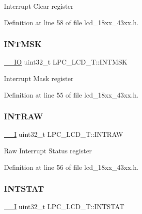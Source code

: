 Interrupt Clear register 

Definition at line 58 of file lcd\+\_\+18xx\+\_\+43xx.\+h.

\mbox{\label{struct_l_p_c___l_c_d___t_a6d3240d9683ac3f5094e224937a841f1}} 
\subsubsection{\texorpdfstring{I\+N\+T\+M\+SK}{INTMSK}}
{\footnotesize\ttfamily \hyperlink{core__sc300_8h_aec43007d9998a0a0e01faede4133d6be}{\+\_\+\+\_\+\+IO} uint32\+\_\+t L\+P\+C\+\_\+\+L\+C\+D\+\_\+\+T\+::\+I\+N\+T\+M\+SK}

Interrupt Mask register 

Definition at line 55 of file lcd\+\_\+18xx\+\_\+43xx.\+h.

\mbox{\label{struct_l_p_c___l_c_d___t_ab94c8521ee68bc8b6748f2ade4632b0c}} 
\subsubsection{\texorpdfstring{I\+N\+T\+R\+AW}{INTRAW}}
{\footnotesize\ttfamily \hyperlink{core__sc300_8h_af63697ed9952cc71e1225efe205f6cd3}{\+\_\+\+\_\+I} uint32\+\_\+t L\+P\+C\+\_\+\+L\+C\+D\+\_\+\+T\+::\+I\+N\+T\+R\+AW}

Raw Interrupt Status register 

Definition at line 56 of file lcd\+\_\+18xx\+\_\+43xx.\+h.

\mbox{\label{struct_l_p_c___l_c_d___t_a8f757ac8345402f52b4c401eadfeb5d9}} 
\subsubsection{\texorpdfstring{I\+N\+T\+S\+T\+AT}{INTSTAT}}
{\footnotesize\ttfamily \hyperlink{core__sc300_8h_af63697ed9952cc71e1225efe205f6cd3}{\+\_\+\+\_\+I} uint32\+\_\+t L\+P\+C\+\_\+\+L\+C\+D\+\_\+\+T\+::\+I\+N\+T\+S\+T\+AT}


